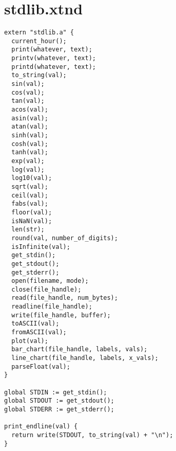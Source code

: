 \section{stdlib.xtnd}
\begin{lstlisting}
extern "stdlib.a" {
  current_hour();
  print(whatever, text);
  printv(whatever, text);
  printd(whatever, text);
  to_string(val);
  sin(val);
  cos(val);
  tan(val);
  acos(val);
  asin(val);
  atan(val);
  sinh(val);
  cosh(val);
  tanh(val);
  exp(val);
  log(val);
  log10(val);
  sqrt(val);
  ceil(val);
  fabs(val);
  floor(val);
  isNaN(val);
  len(str);
  round(val, number_of_digits);
  isInfinite(val);
  get_stdin();
  get_stdout();
  get_stderr();
  open(filename, mode);
  close(file_handle);
  read(file_handle, num_bytes);
  readline(file_handle);
  write(file_handle, buffer);
  toASCII(val);
  fromASCII(val);
  plot(val);
  bar_chart(file_handle, labels, vals);
  line_chart(file_handle, labels, x_vals);
  parseFloat(val);
}

global STDIN := get_stdin();
global STDOUT := get_stdout();
global STDERR := get_stderr();

print_endline(val) {
  return write(STDOUT, to_string(val) + "\n");
}
\end{lstlisting}
